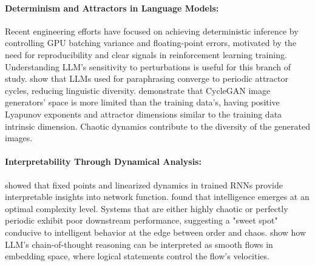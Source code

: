 \documentclass[a4paper,12pt]{article}
\begin{document}
\paragraph{Determinism and Attractors in Language Models:}
\cite{he2025nondeterminism}
Recent engineering efforts have focused on achieving deterministic inference by controlling GPU batching variance and floating-point errors, motivated by the need for reproducibility and clear signals in reinforcement learning training. Understanding LLM's sensitivity to perturbations is useful for this branch of study.
\cite{wang2025unveiling_attractor_cycles} show that LLMs used for paraphrasing converge to periodic attractor cycles, reducing linguistic diversity.
\cite{cyclegan} %
demonstrate that CycleGAN image generators' space is more limited than the training data's, having positive Lyapunov exponents and attractor dimensions similar to the training data intrinsic dimension. Chaotic dynamics contribute to the diversity of the generated images.

\paragraph{Interpretability Through Dynamical Analysis:}
\label{par:interpretability_dynamics}
\cite{sussillo2013} showed that fixed points and linearized dynamics in trained RNNs provide interpretable insights into network function. \cite{zhang2024intelligence_edge_of_chaos} found that intelligence emerges at an optimal complexity level. Systems that are either highly chaotic or perfectly periodic exhibit poor downstream performance, suggesting a "sweet spot" conducive to intelligent behavior at the edge between order and chaos. \cite{zhou2025geometryreasoningflowinglogics} show how LLM's chain-of-thought reasoning can be interpreted as smooth flows in embedding space, where logical statements control the flow's velocities.
\end{document}
